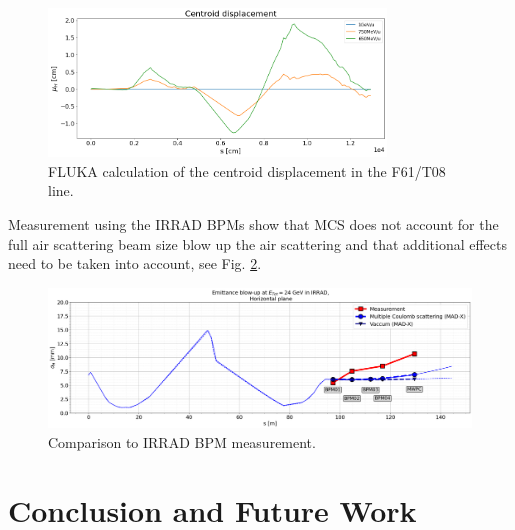 \documentclass{cernatsnote}
\begin{document}
\begin{figure}[!htb]
\centering
\includegraphics[width=0.8\textwidth]{images/centroid_displacement.png}
\caption{FLUKA calculation of the centroid displacement in the F61/T08 line.}
\label{fig:centroid_displacement}
\end{figure}

Measurement using the IRRAD BPMs show that MCS does not account for the full air scattering beam size blow up the air scattering  and that additional effects need to be taken into account, see Fig. \ref{fig:comparison_to_measurement}.

\begin{figure}[!htb]
\centering
\includegraphics[width=1.0\textwidth]{images/comparison_to_measurement.png}
\caption{Comparison to IRRAD BPM measurement.}
\label{fig:comparison_to_measurement}
\end{figure}


\newpage
\section{Conclusion and Future Work}




\end{document}
